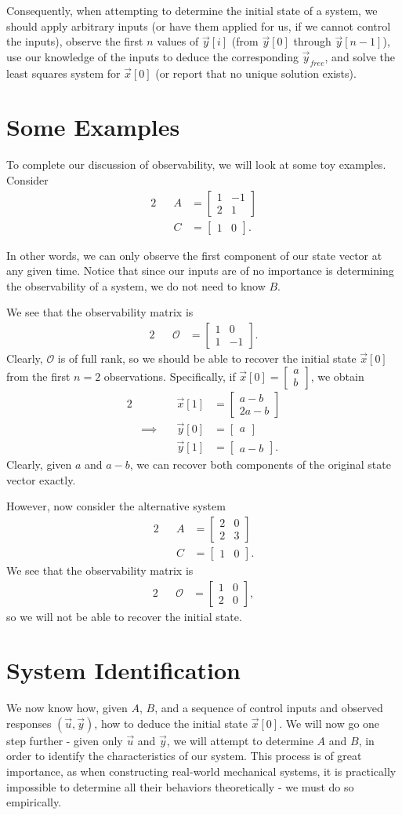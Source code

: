 \documentclass[letterpaper]{article}
\theoremstyle{remark}
\newcommand{\mat}[1]{\ensuremath{\begin{bmatrix}#1\end{bmatrix}}}
\newcommand{\eqn}[1]{\begin{alignat*}{2}#1\end{alignat*}}
\newcommand*{\thus}{&\implies\quad&}
\begin{document}
Consequently, when attempting to determine the initial state of a system, we should apply arbitrary inputs (or have them applied for us, if we cannot control the inputs), observe the first $n$ values of $\vec{y}[i]$ (from $\vec{y}[0]$ through $\vec{y}[n - 1]$), use our knowledge of the inputs to deduce the corresponding $\vec{y}_{free}$, and solve the least squares system for $\vec{x}[0]$ (or report that no unique solution exists).

\section{Some Examples}
To complete our discussion of observability, we will look at some toy examples. Consider
\eqn{
    && A &= \mat{1 & -1 \\ 2 & 1} \\
    && C &= \mat{1 & 0}.
}

In other words, we can only observe the first component of our state vector at any given time. Notice that since our inputs are of no importance is determining the observability of a system, we do not need to know $B$.

We see that the observability matrix is
\eqn{
    && \mathscr{O} &= \mat{1 & 0 \\ 1 & -1}.
}
Clearly, $\mathscr{O}$ is of full rank, so we should be able to recover the initial state $\vec{x}[0]$ from the first $n = 2$ observations. Specifically, if $\vec{x}[0] = \mat{a \\ b}$, we obtain
\eqn{
    && \vec{x}[1] &= \mat{a - b \\ 2a - b} \\
    \thus \vec{y}[0] &= \mat{a} \\
    && \vec{y}[1] &= \mat{a - b}.
}
Clearly, given $a$ and $a - b$, we can recover both components of the original state vector exactly.

However, now consider the alternative system
\eqn{
    && A &= \mat{2 & 0 \\ 2 & 3} \\
    && C &= \mat{1 & 0}.
}
We see that the observability matrix is
\eqn{
    && \mathscr{O} &= \mat{1 & 0 \\ 2 & 0},
}
so we will not be able to recover the initial state.


\section{System Identification}
We now know how, given $A$, $B$, and a sequence of control inputs and observed responses $(\vec{u}, \vec{y})$, how to deduce the initial state $\vec{x}[0]$. We will now go one step further - given only $\vec{u}$ and $\vec{y}$, we will attempt to determine $A$ and $B$, in order to identify the characteristics of our system. This process is of great importance, as when constructing real-world mechanical systems, it is practically impossible to determine all their behaviors theoretically - we must do so empirically.
\end{document}
